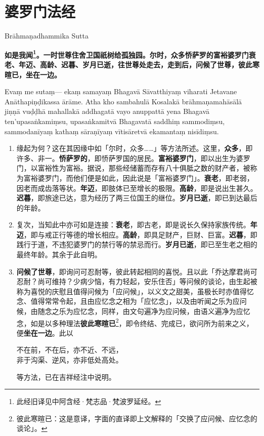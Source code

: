 \section{婆罗门法经}

\begin{center}Brāhmaṇadhammika Sutta\end{center}\vspace{1em}

\textbf{如是我闻\footnote{此经旧译见中阿含经·梵志品·梵波罗延经。}。一时世尊住舍卫国祇树给孤独园。尔时，众多㤭萨罗的富裕婆罗门衰老、年迈、高龄、迟暮、岁月已逝，往世尊处走去，走到后，问候了世尊，彼此寒暄已，坐在一边。}

Evaṃ me sutaṃ— ekaṃ samayaṃ Bhagavā Sāvatthiyaṃ viharati Jetavane Anāthapiṇḍikassa ārāme. Atha kho sambahulā Kosalakā brāhmaṇamahāsālā jiṇṇā vuḍḍhā mahallakā addhagatā vayo anuppattā yena Bhagavā ten’upasaṅkamiṃsu, upasaṅkamitvā Bhagavatā saddhiṃ sammodiṃsu, sammodanīyaṃ kathaṃ sāraṇīyaṃ vītisāretvā ekamantaṃ nisīdiṃsu.

\begin{enumerate}\item 缘起为何？这在其因缘中如「尔时，众多……」等方法所述。这里，\textbf{众多}，即许多、非一。\textbf{㤭萨罗的}，即㤭萨罗国的居民。\textbf{富裕婆罗门}，即以出生为婆罗门，以富裕性为富裕。据说，那些经储蓄而存有八十俱胝之数的财产者，被称为富裕婆罗门，而他们便是如此，因此说是「富裕婆罗门」。\textbf{衰老}，即老弱，因老而成齿落等状。\textbf{年迈}，即肢体已至增长的极限。\textbf{高龄}，即是说出生甚久。\textbf{迟暮}，即旅途已达，意为经历了两三位国王的继位。\textbf{岁月已逝}，即已到达最后的年龄。
\item 复次，当知此中亦可如是连接：\textbf{衰老}，即古老，即是说长久保持家族传统。\textbf{年迈}，即与戒正行等德的增长相应。\textbf{高龄}，即具足财产，巨财、巨富。\textbf{迟暮}，即践行于道，不违犯婆罗门的禁行等的禁忌而行。\textbf{岁月已逝}，即已至生老之相的最终年龄。其余于此自明。
\item \textbf{问候了世尊}，即询问可忍耐等，彼此转起相同的喜悦。且以此「乔达摩君尚可忍耐？尚可维持？少病少恼，有力轻起，安乐住否」等问候的谈论，由生起被称为喜悦的庆慰且值得问候为「应问候」，以义文之甜美，虽极长时亦值得忆念、值得常常令起，且由应忆念之相为「应忆念」，以及由听闻之乐为应问候，由随念之乐为应忆念，同样，由文句遍净为应问候，由语义遍净为应忆念，如是以多种理法\textbf{彼此寒暄已}\footnote{彼此寒暄已：这是意译，字面的直译即上文解释的「交换了应问候、应忆念的谈论」。}，即令终结、完成已，欲问所为前来之义，便\textbf{坐在一边}。此以\begin{quoting}不在前，不在后，亦不近、不远，\\非于沟渠、逆风，亦非低处高处。\end{quoting}等方法，已在吉祥经注中说明。\end{enumerate}

